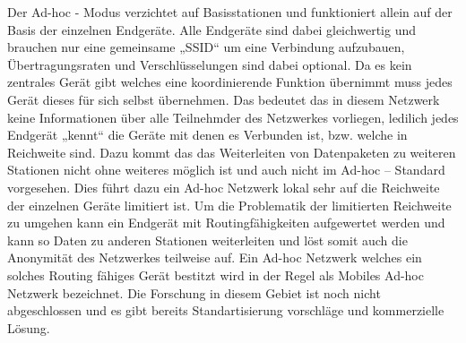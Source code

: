 \documentclass[a4paper,13pt]{scrartcl}
\begin{document}
Der Ad-hoc - Modus verzichtet auf Basisstationen und funktioniert allein auf der Basis der einzelnen Endgeräte. Alle Endgeräte sind dabei gleichwertig und brauchen nur eine gemeinsame „SSID“ um eine Verbindung aufzubauen, Übertragungsraten und Verschlüsselungen sind dabei optional. Da es kein zentrales Gerät gibt welches eine koordinierende Funktion übernimmt muss jedes Gerät dieses für sich selbst übernehmen. Das bedeutet das in diesem Netzwerk keine Informationen über alle Teilnehmder des Netzwerkes vorliegen, ledilich jedes Endgerät „kennt“ die Geräte mit denen es Verbunden ist, bzw. welche in Reichweite sind. Dazu kommt das das Weiterleiten von Datenpaketen zu weiteren Stationen nicht ohne weiteres möglich ist und auch nicht im Ad-hoc – Standard vorgesehen. Dies führt dazu ein Ad-hoc Netzwerk lokal sehr auf die Reichweite der einzelnen Geräte limitiert ist. Um die Problematik der limitierten Reichweite zu umgehen kann ein Endgerät mit Routingfähigkeiten aufgewertet werden und kann so Daten zu anderen Stationen weiterleiten und löst somit auch die Anonymität des Netzwerkes teilweise auf. 
Ein Ad-hoc Netzwerk welches ein solches Routing fähiges Gerät bestitzt wird in der Regel als Mobiles Ad-hoc Netzwerk bezeichnet. Die Forschung in diesem Gebiet ist noch nicht abgeschlossen und es gibt bereits Standartisierung vorschläge und kommerzielle Lösung.
\end{document}
